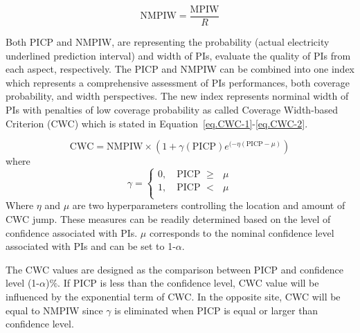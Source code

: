 \documentclass[review]{elsarticle}
\begin{document}
        \begin{equation}
          \text{NMPIW} = \frac{\text{MPIW}}{R}
          \label{eq.NMPIW}
        \end{equation}

        Both PICP and NMPIW, are representing the probability (actual electricity underlined prediction interval) and width of PIs, evaluate the quality of PIs from each aspect, respectively.
        The PICP and NMPIW can be combined into one index which represents a comprehensive assessment of PIs performances, both coverage probability, and width perspectives.
        The new index represents norminal width of PIs with penalties of low coverage probability as called Coverage Width-based Criterion (CWC) which is stated in Equation~\ref{eq.CWC-1}-\ref{eq.CWC-2}.

        \begin{equation}
          \text{CWC}=\text{NMPIW} \times (1+\gamma(\text{PICP})e^{(-\eta(\text{PICP}-\mu)})
          \label{eq.CWC-1}
        \end{equation}
        where
        \begin{equation}
          \gamma =
                \begin{cases}
                  0, \quad \text{PICP $\geq$ $\mu$} \\
                  1, \quad \text{PICP $<$ $\mu$} \\
                \end{cases}
          \label{eq.CWC-2}
        \end{equation}
        Where $\eta$ and $\mu$ are two hyperparameters controlling the location and amount of CWC jump.
        These measures can be readily determined based on the level of confidence associated with PIs.
        $\mu$ corresponds to the nominal confidence level associated with PIs and can be set to 1-$\alpha$.

        The CWC values are designed as the comparison between PICP and confidence level (1-$\alpha$)$\%$.
        If PICP is less than the confidence level, CWC value will be influenced by the exponential term of CWC.
        In the opposite site, CWC will be equal to NMPIW since $\gamma$ is eliminated when PICP is equal or larger than confidence level.
\end{document}
